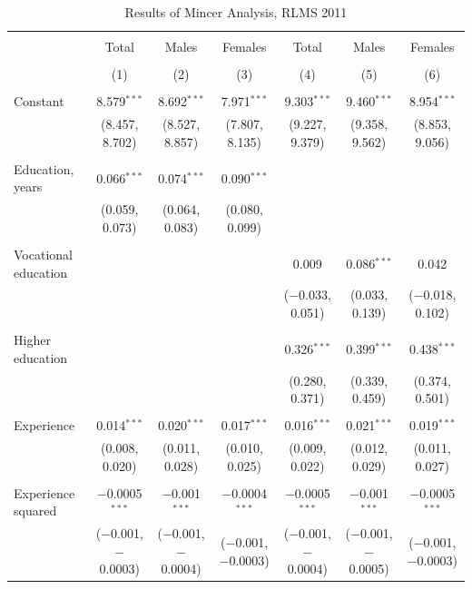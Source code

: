 \documentclass[alpha-refs]{wiley-article-01g}
\begin{document}
\begin{landscape}

\fontsize{9}{11}
\selectfont

\begin{table}[!htbp] \centering 
\renewcommand{\arraystretch}{1.0}
  \caption{Results of Mincer Analysis, RLMS 2011} 
  \label{} 
\begin{tabular}{@{\extracolsep{5pt}}lcccccc} 
\\[-1.8ex]\hline 
\hline \\[-1.8ex] 
 & Total & Males & Females & Total & Males & Females \\ 
\\[-1.8ex] & (1) & (2) & (3) & (4) & (5) & (6)\\ 
\hline \\[-1.8ex] 
 Constant & 8.579$^{***}$ & 8.692$^{***}$ & 7.971$^{***}$ & 9.303$^{***}$ & 9.460$^{***}$ & 8.954$^{***}$ \\ 
  & (8.457, 8.702) & (8.527, 8.857) & (7.807, 8.135) & (9.227, 9.379) & (9.358, 9.562) & (8.853, 9.056) \\ 
  & & & & & & \\ 
 Education, years & 0.066$^{***}$ & 0.074$^{***}$ & 0.090$^{***}$ &  &  &  \\ 
  & (0.059, 0.073) & (0.064, 0.083) & (0.080, 0.099) &  &  &  \\ 
  & & & & & & \\ 
 Vocational education &  &  &  & 0.009 & 0.086$^{***}$ & 0.042 \\ 
  &  &  &  & ($-$0.033, 0.051) & (0.033, 0.139) & ($-$0.018, 0.102) \\ 
  & & & & & & \\ 
 Higher education &  &  &  & 0.326$^{***}$ & 0.399$^{***}$ & 0.438$^{***}$ \\ 
  &  &  &  & (0.280, 0.371) & (0.339, 0.459) & (0.374, 0.501) \\ 
  & & & & & & \\ 
 Experience & 0.014$^{***}$ & 0.020$^{***}$ & 0.017$^{***}$ & 0.016$^{***}$ & 0.021$^{***}$ & 0.019$^{***}$ \\ 
  & (0.008, 0.020) & (0.011, 0.028) & (0.010, 0.025) & (0.009, 0.022) & (0.012, 0.029) & (0.011, 0.027) \\ 
  & & & & & & \\ 
 Experience squared & $-$0.0005$^{***}$ & $-$0.001$^{***}$ & $-$0.0004$^{***}$ & $-$0.0005$^{***}$ & $-$0.001$^{***}$ & $-$0.0005$^{***}$ \\ 
  & ($-$0.001, $-$0.0003) & ($-$0.001, $-$0.0004) & ($-$0.001, $-$0.0003) & ($-$0.001, $-$0.0004) & ($-$0.001, $-$0.0005) & ($-$0.001, $-$0.0003) \\ 

\end{tabular}
\end{table}
\end{landscape}
\end{document}
